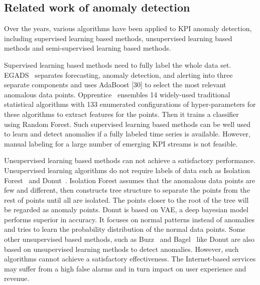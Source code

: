 
\subsection{Related work of anomaly detection}
\label{subsec:Anomaly Detection Methods for KPI Streams}
Over the years, various algorithms have been applied to KPI anomaly detection, including supervised learning based methods, unsupervised learning based methods and semi-supervised learning based methods.

Supervised learning based methods need to fully label the whole data set. EGADS~\cite{egads} separates forecasting, anomaly detection, and alerting into three separate components and uses AdaBoost [30] to select the most relevant anomalous data points. Opprentice~\cite{liu2015opprentice} ensembles 14 widely-used traditional statistical algorithms with 133 enumerated configurations of hyper-parameters for these algorithms to extract features for the points. Then it trains a classifier using Random Forest. 
Such supervised learning based methods can be well used to learn and detect anomalies if a fully labeled time series is available. However, manual labeling for a large number of emerging KPI streams is not feasible.

Unsupervised learning based methods can not achieve a satisfactory performance. Unsupervised learning algorithms do not require labels of data such as Isolation Forest~\cite{ding2013anomaly} and Donut~\cite{xu2018unsupervised}. Isolation Forest assumes that the anomalous data points are few and different, then constructs tree structure to separate the points from the rest of points until all are isolated. The points closer to the root of the tree will be regarded as anomaly points. Donut is based on VAE, a deep bayesian model performs superior in accuracy. It focuses on normal patterns instead of anomalies and tries to learn the probability distribution of the normal data points. Some other unsupervised based methods, such as Buzz~\cite{chen2019unsupervised} and Bagel~\cite{li2018robust} like Donut are also based on unsupervised learning methods to detect anomalies. However, such algorithms cannot achieve a satisfactory effectiveness. The Internet-based services may suffer from a high false alarms and in turn impact on user experience and revenue.

